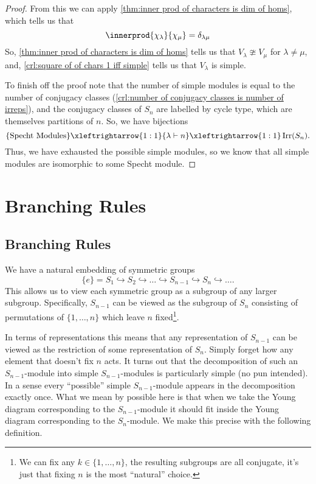 \begin{thm}{}{}
\begin{proof}
        From this we can apply \cref{thm:inner prod of characters is dim of homs}, which tells us that
        \begin{equation}
            \innerprod{\chi_\lambda}{\chi_\mu} = \delta_{\lambda\mu}
        \end{equation}
        So, \cref{thm:inner prod of characters is dim of homs} tells us that \(V_\lambda \ncong V_\mu\) for \(\lambda \ne \mu\), and, \cref{crl:square of of chars 1 iff simple} tells us that \(V_\lambda\) is simple.
        
        To finish off the proof note that the number of simple modules is equal to the number of conjugacy classes (\cref{crl:number of conjugacy classes is number of irreps}), and the conjugacy classes of \(S_n\) are labelled by cycle type, which are themselves partitions of \(n\).
        So, we have bijections
        \begin{equation}
            \{\text{Specht Modules}\} \xleftrightarrow{1:1} \{\lambda \partition n\} \xleftrightarrow{1:1} \Irr(S_n).
        \end{equation}
        Thus, we have exhausted the possible simple modules, so we know that all simple modules are isomorphic to some Specht module.
    \end{proof}
\end{thm}

\chapter{Branching Rules}
\section{Branching Rules}
We have a natural embedding of symmetric groups
\begin{equation}
    \{e\} = S_1 \hookrightarrow S_2 \hookrightarrow \dotso \hookrightarrow S_{n-1} \hookrightarrow S_n \hookrightarrow \dotso.
\end{equation}
This allows us to view each symmetric group as a subgroup of any larger subgroup.
Specifically, \(S_{n-1}\) can be viewed as the subgroup of \(S_n\) consisting of permutations of \(\{1, \dotsc, n\}\) which leave \(n\) fixed\footnote{We can fix any \(k \in \{1, \dotsc, n\}\), the resulting subgroups are all conjugate, it's just that fixing \(n\) is the most \enquote{natural} choice.}.

In terms of representations this means that any representation of \(S_{n-1}\) can be viewed as the restriction of some representation of \(S_n\).
Simply forget how any element that doesn't fix \(n\) acts.
It turns out that the decomposition of such an \(S_{n-1}\)-module into simple \(S_{n-1}\)-modules is particularly simple (no pun intended).
In a sense every \enquote{possible} simple \(S_{n-1}\)-module appears in the decomposition exactly once.
What we mean by possible here is that when we take the Young diagram corresponding to the \(S_{n-1}\)-module it should fit inside the Young diagram corresponding to the \(S_n\)-module.
We make this precise with the following definition.

